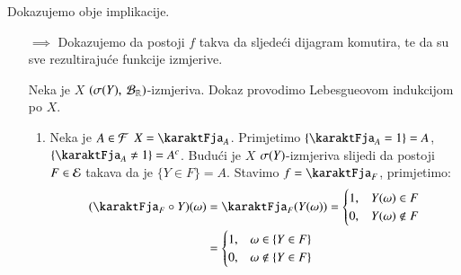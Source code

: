 \begin{rj}[\ref{zad:3.20}]
    Dokazujemo obje implikacije.
    \begin{itemize}
        \item[$\implies$]
        Dokazujemo da postoji $f$ takva da sljede\' ci dijagram komutira, te da su sve rezultiraju\' ce funkcije izmjerive.
        \begin{figure}[H]
            \centering
        \end{figure}
        Neka je $X$ $({\sigma({Y})}, \: {\mathcal{B}_{\mathbb{R}}})$-izmjeriva.
        Dokaz provodimo Lebesgueovom indukcijom po $X$.
        \begin{enumerate}[label=(\arabic*. korak)]
            \item Neka je $A \in \mathcal{F}$ $X = \karaktFja_A$.
            Primjetimo $\{ \karaktFja_A = 1 \} = A$, $\{ \karaktFja_A \neq 1 \} = A^c$.
            Budu\' ci je $X$ $\sigma({Y})$-izmjeriva slijedi da postoji $F \in \mathcal{E}$ takava da je $\{Y \in F\} = A$.
            Stavimo $f = \karaktFja_F$, primjetimo:
            \begin{equation*}
                \begin{aligned}
                    (\karaktFja_F \circ Y)(\omega)
                    &= \karaktFja_F (Y(\omega))
                    =
                    \begin{cases}
                        1, &Y(\omega) \in F\\
                        0, &Y(\omega) \notin F 
                    \end{cases}\\
                    &=
                    \begin{cases}
                        1, &\omega \in \{Y \in F\}\\
                        0, &\omega \notin \{Y \in F\}
                    \end{cases}

\end{aligned}
\end{equation*}
\end{enumerate}
\end{itemize}
\end{rj}
